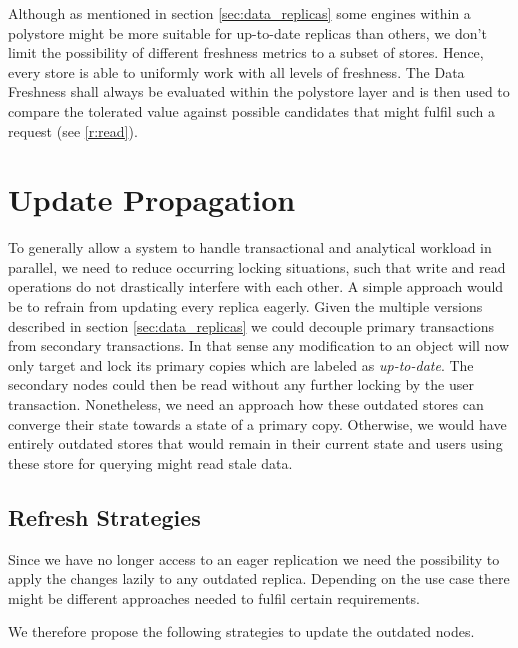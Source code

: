 Although as mentioned in section \ref{sec:data_replicas} some engines within a polystore might be more suitable for up-to-date replicas than others,
we don't limit the possibility of different freshness metrics to a subset of stores. Hence, every store is able to uniformly work with all levels of freshness.
The Data Freshness shall always be evaluated within the polystore layer and is then used to compare the tolerated value against possible candidates that might fulfil such a request 
(see \ref{r:read}).







\section{Update Propagation}
\label{sec:propagation}

To generally allow a system to handle transactional and analytical workload in parallel, we need to reduce occurring locking situations,
such that write and read operations do not drastically interfere with each other.
A simple approach would be to refrain from updating every replica eagerly.
Given the multiple versions described in section \ref{sec:data_replicas} we could decouple primary transactions from 
secondary transactions. In that sense any modification to an object will now only target and lock its primary copies which are labeled as \emph{up-to-date}.
The secondary nodes could then be read without any further locking by the user transaction. 
Nonetheless, we need an approach how these outdated stores can converge their state towards a state of a primary copy.
Otherwise, we would have entirely outdated stores that would remain in their current state and users using these store for querying might read stale data.
 



\subsection{Refresh Strategies}
\label{sec:refresh_strategies}

Since we have no longer access to an eager replication we need the possibility to apply the changes lazily to any outdated replica.
Depending on the use case there might be different approaches needed to fulfil certain requirements.

We therefore propose the following strategies to update the outdated nodes.

